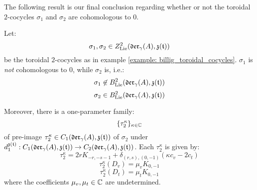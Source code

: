         The following result is our final conclusion regarding whether or not the toroidal $2$-cocycles $\sigma_1$ and $\sigma_2$ are cohomologous to $0$.
        \begin{theorem} \label{theorem: non_trivial_yangian_cocycles_examples}
            Let:
                $$\sigma_1, \sigma_2 \in Z^2_{\mathrm{Lie}}(\mathfrak{der}_{\gamma}(A), \mathfrak{z}(\mathfrak{t}) )$$
            be the toroidal $2$-cocycles as in example \ref{example: billig_toroidal_cocycles}. $\sigma_1$ is \textit{not} cohomologous to $0$, while $\sigma_2$ is, i.e.:
                $$\sigma_1 \not \in B^2_{\mathrm{Lie}}(\mathfrak{der}_{\gamma}(A), \mathfrak{z}(\mathfrak{t}))$$
                $$\sigma_2 \in B^2_{\mathrm{Lie}}(\mathfrak{der}_{\gamma}(A), \mathfrak{z}(\mathfrak{t}))$$
            
            Moreover, there is a one-parameter family:
                $$\{\tau_2^{\kappa}\}_{\kappa \in \mathbb{C}}$$
            of pre-image $\tau_2^{\kappa} \in C_1(\mathfrak{der}_{\gamma}(A), \mathfrak{z}(\mathfrak{t}))$ of $\sigma_2$ under $d_1^{\mathfrak{z}(\mathfrak{t})}: C_1(\mathfrak{der}_{\gamma}(A), \mathfrak{z}(\mathfrak{t})) \to C_2(\mathfrak{der}_{\gamma}(A), \mathfrak{z}(\mathfrak{t}))$. Each $\tau_2^{\kappa}$ is given by:
                $$\tau_2^{\kappa} = 2r K_{-r, -s - 1} + \delta_{(r, s), (0, -1)} ( \kappa c_v - 2c_t )$$
                $$\tau_2^{\kappa}(D_v) = \mu_v K_{0, -1}$$
                $$\tau_2^{\kappa}(D_t) = \mu_t K_{0, -1}$$
            where the coefficients $\mu_v, \mu_t \in \mathbb{C}$ are undetermined.
        \end{theorem}
